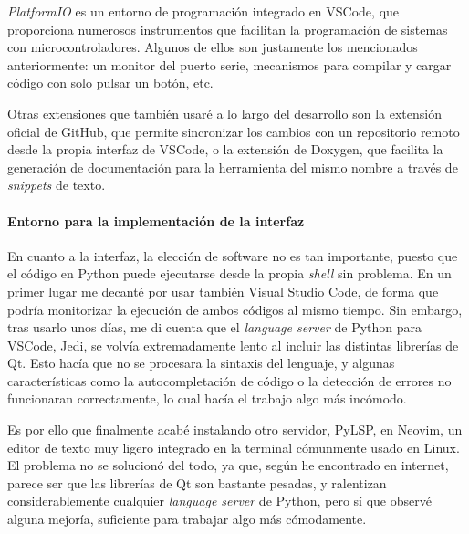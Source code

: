 \textit{PlatformIO} es un entorno de programación integrado en VSCode, que proporciona numerosos instrumentos que facilitan la programación de sistemas con microcontroladores. Algunos de ellos son justamente los mencionados anteriormente: un monitor del puerto serie, mecanismos para compilar y cargar código con solo pulsar un botón, etc.

Otras extensiones que también usaré a lo largo del desarrollo son la extensión oficial de GitHub, que permite sincronizar los cambios con un repositorio remoto desde la propia interfaz de VSCode, o la extensión de Doxygen, que facilita la generación de documentación para la herramienta del mismo nombre a través de \textit{snippets} de texto.

\paragraph{Entorno para la implementación de la interfaz}

En cuanto a la interfaz, la elección de software no es tan importante, puesto que el código en Python puede ejecutarse desde la propia \textit{shell} sin problema. En un primer lugar me decanté por usar también Visual Studio Code, de forma que podría monitorizar la ejecución de ambos códigos al mismo tiempo. Sin embargo, tras usarlo unos días, me di cuenta que el \textit{language server} de Python para VSCode, Jedi, se volvía extremadamente lento al incluir las distintas librerías de Qt. Esto hacía que no se procesara la sintaxis del lenguaje, y algunas características como la autocompletación de código o la detección de errores no funcionaran correctamente, lo cual hacía el trabajo algo más incómodo.

Es por ello que finalmente acabé instalando otro servidor, PyLSP, en Neovim, un editor de texto muy ligero integrado en la terminal cómunmente usado en Linux. El problema no se solucionó del todo, ya que, según he encontrado en internet, parece ser que las librerías de Qt son bastante pesadas, y ralentizan considerablemente cualquier \textit{language server} de Python, pero sí que observé alguna mejoría, suficiente para trabajar algo más cómodamente.
